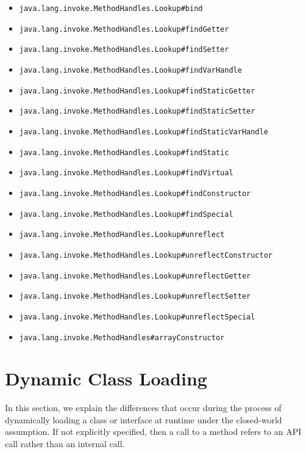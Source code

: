 \begin{itemize}
    \item \texttt{java.lang.invoke.MethodHandles.Lookup\#bind} 
    \item \texttt{java.lang.invoke.MethodHandles.Lookup\#findGetter} 
    \item \texttt{java.lang.invoke.MethodHandles.Lookup\#findSetter} 
    \item \texttt{java.lang.invoke.MethodHandles.Lookup\#findVarHandle} 
    \item \texttt{java.lang.invoke.MethodHandles.Lookup\#findStaticGetter} 
    \item \texttt{java.lang.invoke.MethodHandles.Lookup\#findStaticSetter} 
    \item \texttt{java.lang.invoke.MethodHandles.Lookup\#findStaticVarHandle} 
    \item \texttt{java.lang.invoke.MethodHandles.Lookup\#findStatic} 
    \item \texttt{java.lang.invoke.MethodHandles.Lookup\#findVirtual} 
    \item \texttt{java.lang.invoke.MethodHandles.Lookup\#findConstructor} 
    \item \texttt{java.lang.invoke.MethodHandles.Lookup\#findSpecial} 
    \item \texttt{java.lang.invoke.MethodHandles.Lookup\#unreflect} 
    \item \texttt{java.lang.invoke.MethodHandles.Lookup\#unreflectConstructor} 
    \item \texttt{java.lang.invoke.MethodHandles.Lookup\#unreflectGetter} 
    \item \texttt{java.lang.invoke.MethodHandles.Lookup\#unreflectSetter} 
    \item \texttt{java.lang.invoke.MethodHandles.Lookup\#unreflectSpecial} 
    \item \texttt{java.lang.invoke.MethodHandles\#arrayConstructor}
\end{itemize}

\section{Dynamic Class Loading}
In this section, we explain the differences that occur during the process of dynamically loading a class or interface at runtime under the closed-world assumption. If not explicitly specified, then a call to a method refers to an API call rather than an internal call.

